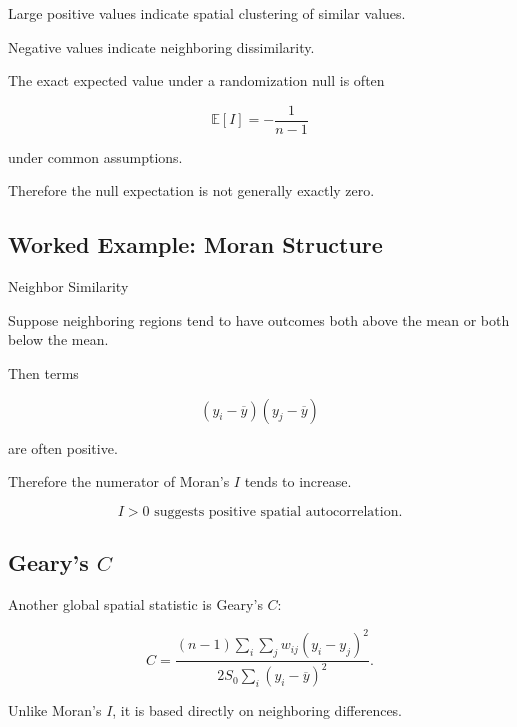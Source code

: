 Large positive values indicate spatial clustering of similar values.

Negative values indicate neighboring dissimilarity.

The exact expected value under a randomization null is often

\[
\boxed{
\mathbb{E}[I]
=
-\frac1{n-1}
}
\]

under common assumptions.

Therefore the null expectation is not generally exactly zero.

\subsection{Worked Example: Moran Structure}
\label{subsec:worked-moran-structure}

\begin{workedexamplebox}{Neighbor Similarity}

Suppose neighboring regions tend to have outcomes both above the mean or
both below the mean.

Then terms

\[
(
y_i-\overline{y}
)
(
y_j-\overline{y}
)
\]

are often positive.

Therefore the numerator of Moran's \(I\) tends to increase.

\begin{answerbox}
\[
\boxed{
I>0
\text{ suggests positive spatial autocorrelation.}
}
\]
\end{answerbox}

\end{workedexamplebox}

\subsection{Geary's \(C\)}
\label{subsec:gearys-c}

Another global spatial statistic is Geary's \(C\):

\[
\boxed{
C
=
\frac{
(n-1)
\displaystyle
\sum_i
\sum_j
w_{ij}
(
y_i-y_j
)^2
}{
2S_0
\displaystyle
\sum_i
(
y_i-\overline{y}
)^2
}.
}
\]

Unlike Moran's \(I\), it is based directly on neighboring differences.

